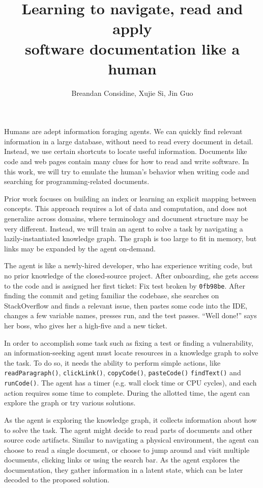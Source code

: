 \documentclass[11pt]{article}
\title{Learning to navigate, read and apply\\software documentation like a human}
\author{Breandan Considine, Xujie Si, Jin Guo}
\begin{document}
\maketitle

Humans are adept information foraging agents. We can quickly find relevant information in a large database, without need to read every document in detail. Instead, we use certain shortcuts to locate useful information. Documents like code and web pages contain many clues for how to read and write software. In this work, we will try to emulate the human's behavior when writing code and searching for programming-related documents.

Prior work focuses on building an index or learning an explicit mapping between concepts. This approach requires a lot of data and computation, and does not generalize across domains, where terminology and document structure may be very different. Instead, we will train an agent to solve a task by navigating a lazily-instantiated knowledge graph. The graph is too large to fit in memory, but links may be expanded by the agent on-demand.

The agent is like a newly-hired developer, who has experience writing code, but no prior knowledge of the closed-source project. After onboarding, she gets access to the code and is assigned her first ticket: Fix test broken by \texttt{0fb98be}. After finding the commit and geting familiar the codebase, she searches on StackOverflow and finds a relevant issue, then pastes some code into the IDE, changes  a few variable names, presses run, and the test passes. ``Well done!'' says her boss, who gives her a high-five and a new ticket.

In order to accomplish some task such as fixing a test or finding a vulnerability, an information-seeking agent must locate resources in a knowledge graph to solve the task. To do so, it needs the ability to perform simple actions, like \texttt{readParagraph()}, \texttt{clickLink()}, \texttt{copyCode()}, \texttt{pasteCode()} \texttt{findText()} and \texttt{runCode()}. The agent has a timer (e.g. wall clock time or CPU cycles), and each action requires some time to complete. During the allotted time, the agent can explore the graph or try various solutions.

As the agent is exploring the knowledge graph, it collects information about how to solve the task. The agent might decide to read parts of documents and other source code artifacts. Similar to navigating a physical environment, the agent can choose to read a single document, or choose to jump around and visit multiple documents, clicking links or using the search bar. As the agent explores the documentation, they gather information in a latent state, which can be later decoded to the proposed solution.
\end{document}
